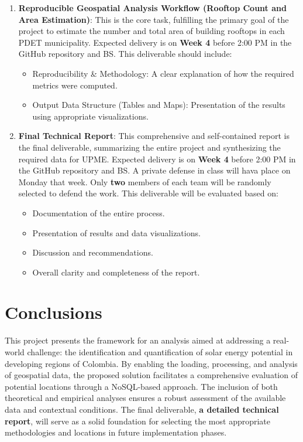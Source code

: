 \documentclass[12pt]{article}
\begin{document}
\begin{enumerate}
    \item \textbf{Reproducible Geospatial Analysis Workflow (Rooftop Count and Area Estimation)}: This is the core task, fulfilling the primary goal of the project to estimate the number and total area of building rooftops in each PDET municipality. Expected delivery is on \textbf{Week 4} before 2:00 PM in the GitHub repository and BS\texttrademark. This deliverable should include:
        \begin{itemize}
          \item Reproducibility \& Methodology: A clear explanation of how the required metrics were computed.
          \item Output Data Structure (Tables and Maps): Presentation of the results using appropriate visualizations.
        \end{itemize}

    \item \textbf{Final Technical Report}: This comprehensive and self-contained report is the final deliverable, summarizing the entire project and synthesizing the required data for UPME. Expected delivery is on \textbf{Week 4} before 2:00 PM in the GitHub repository and BS\texttrademark.  A private defense in class will hava place on Monday that week. Only \textbf{two} members of each team will be randomly selected to defend the work. This deliverable will be evaluated based on:
        \begin{itemize}
          \item Documentation of the entire process.
          \item Presentation of results and data visualizations.
          \item Discussion and recommendations.
          \item Overall clarity and completeness of the report.
        \end{itemize}
\end{enumerate}

\section{Conclusions}
This project presents the framework for an analysis aimed at addressing a real-world challenge: the identification and quantification of solar energy potential in developing regions of Colombia. By enabling the loading, processing, and analysis of geospatial data, the proposed solution facilitates a comprehensive evaluation of potential locations through a NoSQL-based approach. The inclusion of both theoretical and empirical analyses ensures a robust assessment of the available data and contextual conditions. The final deliverable, \textbf{a detailed technical report}, will serve as a solid foundation for selecting the most appropriate methodologies and locations in future implementation phases.
\end{document}
